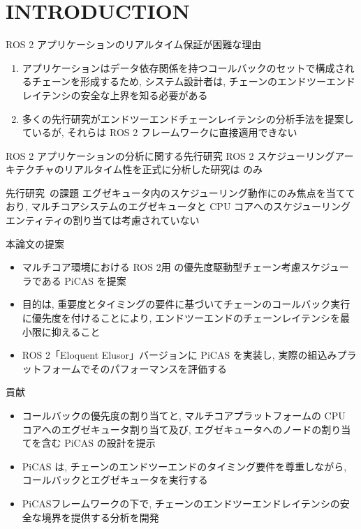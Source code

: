 
\section{INTRODUCTION}
\label{sec: introduction}

\begin{frame}{ROS 2 アプリケーションのリアルタイム保証が困難な理由}
    \begin{enumerate}
        \item アプリケーションはデータ依存関係を持つコールバックのセットで構成されるチェーンを形成するため, システム設計者は, チェーンのエンドツーエンドレイテンシの安全な上界を知る必要がある
        \item 多くの先行研究がエンドツーエンドチェーンレイテンシの分析手法を提案しているが, それらは ROS 2 フレームワークに直接適用できない
    \end{enumerate}
\end{frame}

\begin{frame}{ROS 2 アプリケーションの分析に関する先行研究}
    ROS 2 スケジューリングアーキテクチャのリアルタイム性を正式に分析した研究は \cite{casini2019response} のみ
    \begin{block}{先行研究~\cite{casini2019response}の課題}
        エグゼキュータ内のスケジューリング動作にのみ焦点を当てており, マルチコアシステムのエグゼキュータと CPU コアへのスケジューリングエンティティの割り当ては考慮されていない
    \end{block}
\end{frame}

\begin{frame}{本論文の提案}
    \begin{itemize}
        \item マルチコア環境における ROS 2用 の優先度駆動型チェーン考慮スケジューラである PiCAS を提案
        \item 目的は, 重要度とタイミングの要件に基づいてチェーンのコールバック実行に優先度を付けることにより, エンドツーエンドのチェーンレイテンシを最小限に抑えること
        \item ROS 2「Eloquent Elusor」バージョンに PiCAS を実装し, 実際の組込みプラットフォームでそのパフォーマンスを評価する
    \end{itemize}
\end{frame}

\begin{frame}{貢献}
    \begin{itemize}
        \item  コールバックの優先度の割り当てと, マルチコアプラットフォームの CPU コアへのエグゼキュータ割り当て及び, エグゼキュータへのノードの割り当てを含む PiCAS の設計を提示
        \item PiCAS は, チェーンのエンドツーエンドのタイミング要件を尊重しながら, コールバックとエグゼキュータを実行する
        \item  PiCASフレームワークの下で, チェーンのエンドツーエンドレイテンシの安全な境界を提供する分析を開発
    \end{itemize}
\end{frame}
